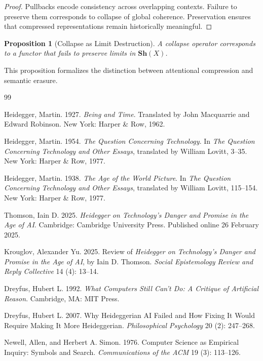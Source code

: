 \documentclass[11pt]{article}
\newtheorem{proposition}{Proposition}
\theoremstyle{remark}
\begin{document}
\begin{proof}
Pullbacks encode consistency across overlapping contexts. Failure to preserve them corresponds to collapse of global coherence. Preservation ensures that compressed representations remain historically meaningful.
\end{proof}

\begin{proposition}[Collapse as Limit Destruction]
A collapse operator corresponds to a functor that fails to preserve limits in $\mathbf{Sh}(X)$.
\end{proposition}

This proposition formalizes the distinction between attentional compression and semantic erasure.

\begin{thebibliography}{99}

Heidegger, Martin. 1927.
\textit{Being and Time}.
Translated by John Macquarrie and Edward Robinson.
New York: Harper \& Row, 1962.

Heidegger, Martin. 1954.
\textit{The Question Concerning Technology}.
In \textit{The Question Concerning Technology and Other Essays},
translated by William Lovitt, 3--35.
New York: Harper \& Row, 1977.

Heidegger, Martin. 1938.
\textit{The Age of the World Picture}.
In \textit{The Question Concerning Technology and Other Essays},
translated by William Lovitt, 115--154.
New York: Harper \& Row, 1977.

Thomson, Iain D. 2025.
\textit{Heidegger on Technology’s Danger and Promise in the Age of AI}.
Cambridge: Cambridge University Press.
Published online 26 February 2025.

Krouglov, Alexander Yu. 2025.
Review of \textit{Heidegger on Technology’s Danger and Promise in the Age of AI},
by Iain D. Thomson.
\textit{Social Epistemology Review and Reply Collective} 14 (4): 13--14.

Dreyfus, Hubert L. 1992.
\textit{What Computers Still Can’t Do: A Critique of Artificial Reason}.
Cambridge, MA: MIT Press.

Dreyfus, Hubert L. 2007.
Why Heideggerian AI Failed and How Fixing It Would Require Making It More Heideggerian.
\textit{Philosophical Psychology} 20 (2): 247--268.

Newell, Allen, and Herbert A. Simon. 1976.
Computer Science as Empirical Inquiry: Symbols and Search.
\textit{Communications of the ACM} 19 (3): 113--126.


\end{thebibliography}
\end{document}
